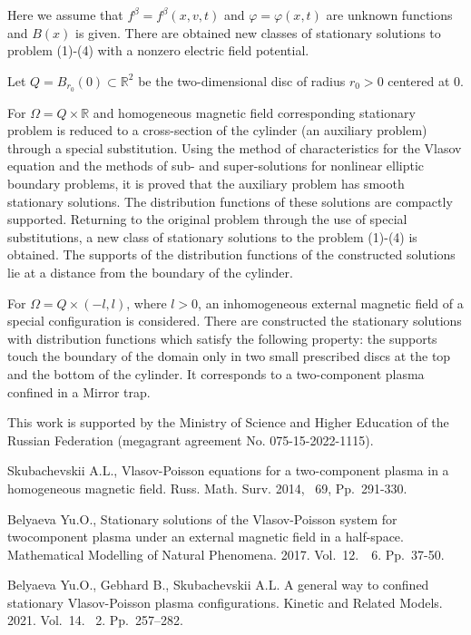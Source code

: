 \documentclass[12pt]{llncs}
\begin{document}
Here we assume that $f^\beta=f^\beta(x,v,t)$ and 
$\varphi=\varphi(x,t)$ are unknown functions and 
$B(x)$ is given.
There are obtained new classes of stationary solutions to problem (1)-(4)
with a nonzero electric field potential.

Let $Q=B_{r_0}(0) \subset \mathbb{R}^2$
be the two-dimensional disc of radius $r_0>0$ centered at 0. 

For $\Omega=Q\times \mathbb{R}$ and 
homogeneous magnetic field corresponding stationary problem is reduced to a cross-section of the cylinder (an auxiliary problem) through a special substitution. Using the method of characteristics for the Vlasov equation and the methods of sub- and super-solutions for nonlinear elliptic boundary problems, it is proved that the auxiliary problem has smooth stationary solutions. The distribution functions of these solutions are compactly supported. Returning to the original problem through the use of special substitutions, a new class of stationary solutions to the problem (1)-(4) is obtained. The supports of the distribution functions of the constructed solutions lie at a distance from the boundary of the cylinder.


For  $\Omega=Q\times (-l,l)$, where $l>0$,  an inhomogeneous external magnetic field of
a special configuration is considered. There are constructed the stationary solutions
with distribution functions which satisfy the following property: the supports touch
the boundary of the domain only in two small prescribed discs at the top and the
bottom of the cylinder. It corresponds to a two-component plasma confined in a Mirror trap. 

This work is supported by the Ministry of Science and Higher Education of the Russian Federation (megagrant agreement No. 075-15-2022-1115).

\begin{thebibliography}{9} 

Skubachevskii A.L., Vlasov-Poisson equations for a two-component plasma in a homogeneous
magnetic field. Russ. Math. Surv. 2014, ~69, Pp.~291-330.


Belyaeva Yu.O., Stationary solutions of the Vlasov-Poisson system for twocomponent
plasma under an external magnetic field in a half-space.
Mathematical Modelling of Natural Phenomena. 2017. Vol.~12.~\textnumero~6.
Pp.~37-50.

Belyaeva Yu.O., Gebhard B., Skubachevskii A.L. 
A general way to confined stationary Vlasov-Poisson plasma configurations. Kinetic and Related Models. 2021. Vol.~14. \textnumero~2.  Pp.~257--282.
\end{thebibliography}
\end{document}
